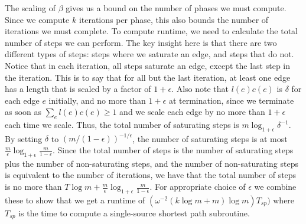 The scaling of $\beta$ gives us a bound on the number of phases we
must compute. Since we compute $k$ iterations per phase, this also
bounds the number of iterations we must complete. To compute runtime,
we need to calculate the total number of steps we can perform. The key
insight here is that there are two different types of steps: steps
where we saturate an edge, and steps that do not. Notice that in each
iteration, all steps saturate an edge, except the last step in the
iteration. This is to say that for all but the last iteration, at
least one edge has a length that is scaled by a factor of
$1+\epsilon$. Also note that $l(e)c(e)$ is $\delta$ for each edge $e$
initially, and no
more than $1+\epsilon$ at termination, since we terminate as soon as
$\sum_el(e)c(e)\geq 1$ and we scale each edge by no more than
$1+\epsilon$ each time we scale. Thus, the total number of saturating
steps is $m\log_{1+\epsilon}\delta^{-1}$. By setting $\delta$ to
$(m/(1-\epsilon))^{-1/\epsilon}$, the number of saturating steps is at most
$\frac{m}{\epsilon}\log_{1+\epsilon}\frac{m}{1-\epsilon}$. Since the
total number of steps is the number of saturating steps plus the
number of non-saturating steps, and the number of non-saturating steps
is equivalent to the number of iterations, we have that the total
number of steps is no more than 
$T\log m+\frac{m}{\epsilon}\log_{1+\epsilon}\frac{m}{1-\epsilon}$. For
appropriate choice of $\epsilon$ we combine these to show that we get
a runtime of $(\omega^{-2}(k\log m+m)\log m)T_{sp})$ where $T_{sp}$ is the time to
compute a single-source shortest path subroutine.

